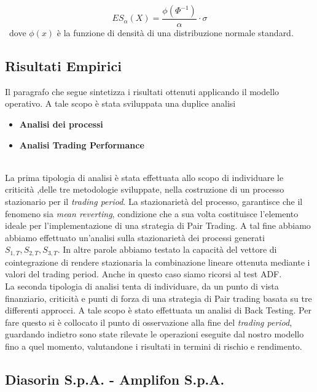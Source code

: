 \documentclass[]{article}
\begin{document}
\begin{equation}
	ES_{\alpha}(X) = \frac{\phi(\Phi^{-1})}{\alpha} \cdot \sigma
\end{equation}
\
dove $\phi(x)$ è la funzione di densità di una distribuzione normale standard.
\subsection{Risultati Empirici}

Il paragrafo che segue sintetizza i risultati ottenuti applicando il modello operativo.
A tale scopo è stata sviluppata una duplice analisi

\begin{itemize}
	\item \textbf{Analisi dei processi}
	\item \textbf{Analisi Trading Performance}
\end{itemize}
\
\\
La prima tipologia di analisi è stata effettuata allo scopo di individuare le criticità ,delle tre metodologie sviluppate, nella costruzione di un processo stazionario per il \textit{trading period}. La stazionarietà del processo, garantisce che il fenomeno sia \textit{mean reverting}, condizione che a sua volta costituisce l'elemento ideale per l'implementazione di una strategia di Pair Trading.
A tal fine abbiamo abbiamo effettuato un'analisi sulla stazionarietà dei processi generati $S_{1,T},S_{2,T},S_{3,T}$.
In altre parole abbiamo testato la capacità del vettore di cointegrazione di rendere stazionaria la combinazione lineare ottenuta mediante i valori del trading period. Anche in questo caso siamo ricorsi al test ADF.
\\
La seconda tipologia di analisi tenta di individuare, da un punto di vista finanziario, criticità e punti di forza di una strategia di Pair trading basata su tre differenti approcci.
A tale scopo è stato effettuata un analisi di Back Testing.
Per fare questo si è collocato il punto di osservazione alla fine del \textit{trading period}, guardando indietro sono state rilevate le operazioni eseguite dal nostro modello fino a quel momento, valutandone i risultati in termini di rischio e rendimento.

\break
\subsection*{Diasorin S.p.A. - Amplifon S.p.A.}
\end{document}
